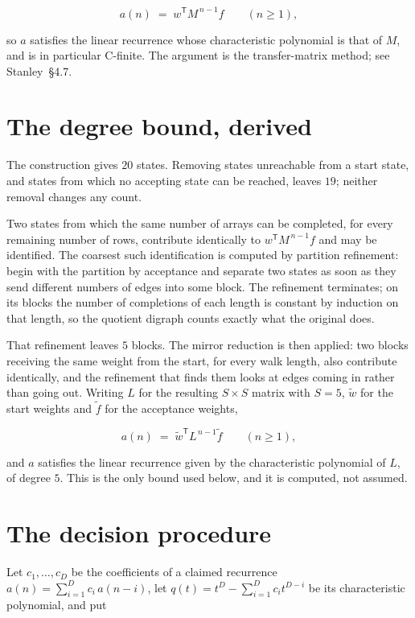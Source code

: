 \documentclass[11pt]{article}
\theoremstyle{definition}
\begin{document}
\[a(n) \;=\; w^{\mathsf T} M^{\,n-1} f \qquad (n \ge 1),\]

so $a$ satisfies the linear recurrence whose characteristic polynomial is that of $M$, and is in particular C-finite. The argument is the transfer-matrix method; see Stanley~\S4.7.

\section{The degree bound, derived}

The construction gives $20$ states. Removing states unreachable from a start state, and states from which no accepting state can be reached, leaves $19$; neither removal changes any count.

Two states from which the same number of arrays can be completed, for every remaining number of rows, contribute identically to $w^{\mathsf T}M^{\,n-1}f$ and may be identified. The coarsest such identification is computed by partition refinement: begin with the partition by acceptance and separate two states as soon as they send different numbers of edges into some block. The refinement terminates; on its blocks the number of completions of each length is constant by induction on that length, so the quotient digraph counts exactly what the original does.

That refinement leaves $5$ blocks. The mirror reduction is then applied: two blocks receiving the same weight from the start, for every walk length, also contribute identically, and the refinement that finds them looks at edges coming in rather than going out. Writing $L$ for the resulting $S \times S$ matrix with $S = 5$, $\tilde w$ for the start weights and $\tilde f$ for the acceptance weights,

\[a(n) \;=\; \tilde w^{\mathsf T} L^{\,n-1} \tilde f \qquad (n \ge 1),\]

and $a$ satisfies the linear recurrence given by the characteristic polynomial of $L$, of degree $5$. This is the only bound used below, and it is computed, not assumed.

\section{The decision procedure}

Let $c_1,\dots,c_D$ be the coefficients of a claimed recurrence $a(n) = \sum_{i=1}^{D} c_i\,a(n-i)$, let $q(t) = t^{D} - \sum_{i=1}^{D} c_i t^{D-i}$ be its characteristic polynomial, and put
\end{document}
